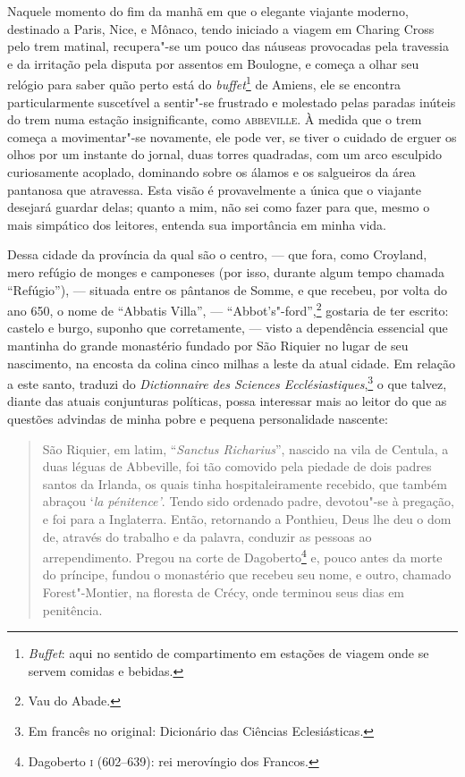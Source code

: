 Naquele momento do fim da manhã em que o elegante viajante moderno,
destinado a Paris, Nice, e Mônaco, tendo iniciado a viagem em Charing
Cross pelo trem matinal, recupera"-se um pouco das náuseas provocadas
pela travessia e da irritação pela disputa por assentos em Boulogne, e
começa a olhar seu relógio para saber quão perto está do
\textit{buffet}\footnote{\textit{Buffet}: aqui no sentido de compartimento
  em estações de viagem onde se servem comidas e bebidas.}
de Amiens, ele se encontra particularmente suscetível a sentir"-se
frustrado e molestado pelas paradas inúteis do trem numa estação
insignificante, como \textsc{abbeville}. À medida que o trem começa a
movimentar"-se novamente, ele pode ver, se tiver o cuidado de erguer os
olhos por um instante do jornal, duas torres quadradas, com um arco
esculpido curiosamente acoplado, dominando sobre os álamos e os
salgueiros da área pantanosa que atravessa. Esta visão é provavelmente a
única que o viajante desejará guardar delas; quanto a mim, não sei como
fazer para que, mesmo o mais simpático dos leitores, entenda sua
importância em minha vida.

Dessa cidade da província da qual são o centro, --- que fora, como
Croyland, mero refúgio de monges e camponeses (por isso, durante algum
tempo chamada ``Refúgio''), --- situada entre os pântanos de Somme, e que
recebeu, por volta do ano 650, o nome de ``Abbatis Villa'', ---
``Abbot's"-ford'',\footnote{Vau do Abade.} gostaria de
ter escrito: castelo e burgo, suponho que corretamente, --- visto a
dependência essencial que mantinha do grande monastério fundado por São
Riquier no lugar de seu nascimento, na encosta da colina cinco milhas a
leste da atual cidade. Em relação a este santo, traduzi do
\textit{Dictionnaire des Sciences Ecclésiastiques},\footnote{Em francês no
  original: Dicionário das Ciências Eclesiásticas.} o
que talvez, diante das atuais conjunturas políticas, possa interessar
mais ao leitor do que as questões advindas de minha pobre e pequena
personalidade nascente: %

\begin{quote}
São Riquier, em latim, ``\textit{Sanctus Richarius}'', nascido na vila
de Centula, a duas léguas de Abbeville, foi tão comovido pela piedade de
dois padres santos da Irlanda, os quais tinha hospitaleiramente
recebido, que também abraçou `\textit{la pénitence'}. Tendo sido ordenado
padre, devotou"-se à pregação, e foi para a Inglaterra. Então, retornando
a Ponthieu, Deus lhe deu o dom de, através do trabalho e da palavra,
conduzir as pessoas ao arrependimento. Pregou na corte de
Dagoberto\footnote{Dagoberto \textsc{i} (602--639): rei merovíngio dos Francos.} e, pouco antes da morte do príncipe, fundou o
monastério que recebeu seu nome, e outro, chamado Forest"-Montier, na
floresta de Crécy, onde terminou seus dias em penitência.
\end{quote}

